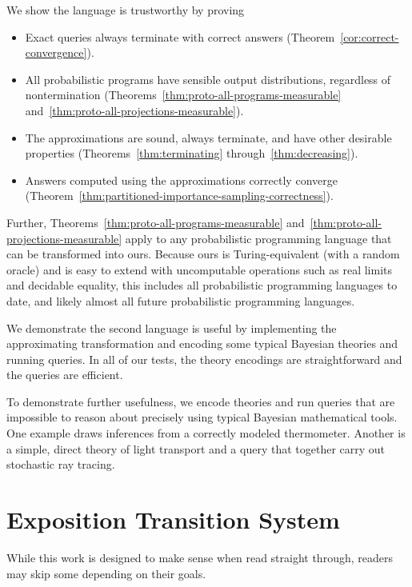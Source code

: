 We show the language is trustworthy by proving
\begin{itemize}
	\item Exact queries always terminate with correct answers (Theorem~\ref{cor:correct-convergence}).
	\item All probabilistic programs have sensible output distributions, regardless of nontermination (Theorems~\ref{thm:proto-all-programs-measurable} and~\ref{thm:proto-all-projections-measurable}).
	\item The approximations are sound, always terminate, and have other desirable properties (Theorems~\ref{thm:terminating} through~\ref{thm:decreasing}).
	\item Answers computed using the approximations correctly converge (Theorem~\ref{thm:partitioned-importance-sampling-correctness}).
\end{itemize}
Further, Theorems~\ref{thm:proto-all-programs-measurable} and~\ref{thm:proto-all-projections-measurable} apply to any probabilistic programming language that can be transformed into ours.
Because ours is Turing-equivalent (with a random oracle) and is easy to extend with uncomputable operations such as real limits and decidable equality, this includes all probabilistic programming languages to date, and likely almost all future probabilistic programming languages.

We demonstrate the second language is useful by implementing the approximating transformation and encoding some typical Bayesian theories and running queries.
In all of our tests, the theory encodings are straightforward and the queries are efficient.

To demonstrate further usefulness, we encode theories and run queries that are impossible to reason about precisely using typical Bayesian mathematical tools.
One example draws inferences from a correctly modeled thermometer.
Another is a simple, direct theory of light transport and a query that together carry out stochastic ray tracing.

\section{Exposition Transition System}

While this work is designed to make sense when read straight through, readers may skip some depending on their goals.

